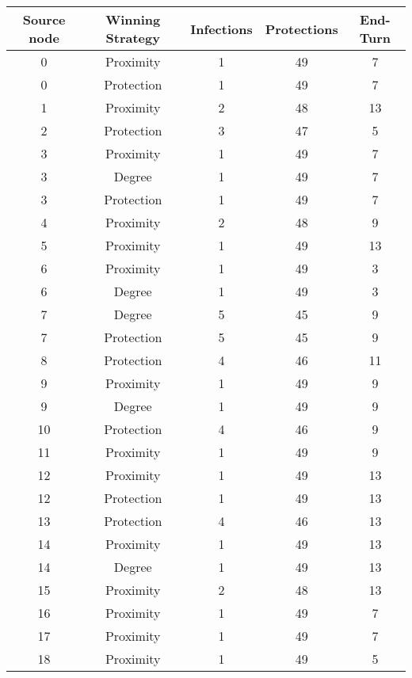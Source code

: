 \documentclass[results.tex]{subfiles}
\begin{document}
\begin{center}
  \begin{tabular}{| c || c | c | c | c |}
    \hline
    {\bfseries Source node} & {\bfseries Winning Strategy} & {\bfseries Infections} & {\bfseries Protections} & {\bfseries End-Turn} \\  %
    \hline\hline
    0 & Proximity & 1 & 49 & 7 \\ 
    \hline
    0 & Protection & 1 & 49 & 7 \\ 
    \hline
    1 & Proximity & 2 & 48 & 13 \\ 
    \hline
    2 & Protection & 3 & 47 & 5 \\ 
    \hline
    3 & Proximity & 1 & 49 & 7 \\ 
    \hline
    3 & Degree & 1 & 49 & 7 \\ 
    \hline
    3 & Protection & 1 & 49 & 7 \\ 
    \hline
    4 & Proximity & 2 & 48 & 9 \\ 
    \hline
    5 & Proximity & 1 & 49 & 13 \\ 
    \hline
    6 & Proximity & 1 & 49 & 3 \\ 
    \hline
    6 & Degree & 1 & 49 & 3 \\ 
    \hline
    7 & Degree & 5 & 45 & 9 \\ 
    \hline
    7 & Protection & 5 & 45 & 9 \\ 
    \hline
    8 & Protection & 4 & 46 & 11 \\ 
    \hline
    9 & Proximity & 1 & 49 & 9 \\ 
    \hline
    9 & Degree & 1 & 49 & 9 \\ 
    \hline
    10 & Protection & 4 & 46 & 9 \\ 
    \hline
    11 & Proximity & 1 & 49 & 9 \\ 
    \hline
    12 & Proximity & 1 & 49 & 13 \\ 
    \hline
    12 & Protection & 1 & 49 & 13 \\ 
    \hline
    13 & Protection & 4 & 46 & 13 \\ 
    \hline
    14 & Proximity & 1 & 49 & 13 \\ 
    \hline
    14 & Degree & 1 & 49 & 13 \\ 
    \hline
    15 & Proximity & 2 & 48 & 13 \\ 
    \hline
    16 & Proximity & 1 & 49 & 7 \\ 
    \hline
    17 & Proximity & 1 & 49 & 7 \\ 
    \hline
    18 & Proximity & 1 & 49 & 5 \\ 

\end{tabular}
\end{center}
\end{document}

